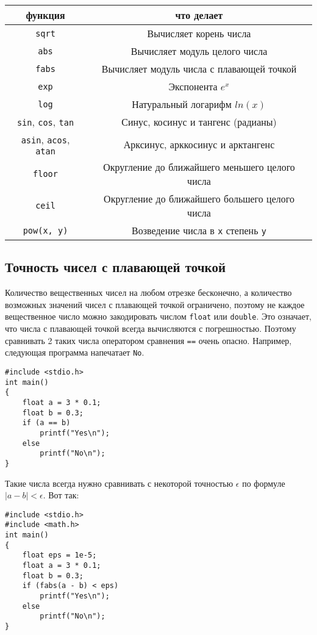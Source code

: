 \documentclass{article}
\begin{document}
\begin{center}
\begin{tabular}{ c c }
 функция & что делает \\ \hline
 \texttt{sqrt}     & Вычисляет корень числа \\ 
 \texttt{abs}      & Вычисляет модуль целого числа \\ 
 \texttt{fabs}     & Вычисляет модуль числа с плавающей точкой \\ 
 \texttt{exp}      & Экспонента $e^x$ \\ 
 \texttt{log}      & Натуральный логарифм $ln(x)$ \\
 \texttt{sin}, \texttt{cos},  \texttt{tan} & Синус, косинус и тангенс (радианы) \\ 
 \texttt{asin}, \texttt{acos},  \texttt{atan} & Арксинус, арккосинус и арктангенс \\ 
 \texttt{floor}      & Округление до ближайшего меньшего целого числа \\
 \texttt{ceil}       & Округление до ближайшего большего целого числа \\
 \texttt{pow(x, y)}        & Возведение числа в \texttt{x} степень \texttt{y} \\
\end{tabular}
\end{center}


\subsection*{Точность чисел с плавающей точкой}
Количество вещественных чисел на любом отрезке бесконечно, а количество возможных значений чисел с плавающей точкой ограничено, поэтому не каждое вещественное число можно закодировать числом \texttt{float} или \texttt{double}. Это означает, что числа с плавающей точкой всегда вычисляются с погрешностью. Поэтому сравнивать 2 таких числа оператором сравнения \texttt{==} очень опасно. Например, следующая программа напечатает \texttt{No}.
\begin{lstlisting}
#include <stdio.h>
int main() 
{
    float a = 3 * 0.1;
    float b = 0.3;
    if (a == b)
        printf("Yes\n");
    else
        printf("No\n");
}
\end{lstlisting}

Такие числа всегда нужно сравнивать с некоторой точностью $\epsilon$ по формуле $|a - b| < \epsilon$. Вот так:\\ 
\begin{lstlisting}
#include <stdio.h>
#include <math.h>
int main() 
{
    float eps = 1e-5;
    float a = 3 * 0.1;
    float b = 0.3;
    if (fabs(a - b) < eps)
        printf("Yes\n");
    else
        printf("No\n");
}
\end{lstlisting}
\end{document}
